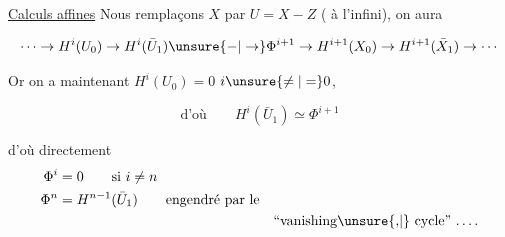 \uline{Calculs affines} \qquad Nous remplaçons $X$ par $U=X-Z$ ( à l'infini), on aura

\[
\cdots\to H^i(U_0)\to H^i(\bar U_1)\unsure{\mathord{-}|\to}\Phi^{i+1}\to H^{i+1}(X_0)\to H^{i+1}(\bar X_1)\to\cdots
\]

Or on a maintenant \uline{$H^i(U_0)=0$} \qquad $i\unsure{\ne|=}0$,

\[
\text{d'où}\qquad H^i(\bar U_1)\simeq\Phi^{i+1}
\]

d'où directement
\[
\begin{aligned}
\Phi^i&=0\qquad\text{si }i\ne n\\
\Phi^n&=H^{n-1}(\bar U_1)\qquad\text{engendré par le}\\
&&\text{``vanishing\unsure{,|\null} cycle'' \ldots.}
\end{aligned}
\]

